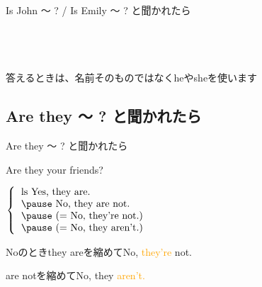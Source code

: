 \documentclass[aspectratio=169]{beamer}
\newcommand{\myaudio}[1]{\href{#1}{\faVolumeUp}}
\begin{document}
\begin{frame}[plain]{Is John  〜 ? / Is Emily 〜 ? と聞かれたら}
\begin{columns}[t]
\begin{column}{.49\textwidth}
\pause

\vspace{20pt}

\mbox{}\hfill\myaudio{./audio/009_answer_be_03.mp3}\,\,{}
\end{column}
\end{columns}

\pause

{\small 答えるときは、名前そのものではなくheやsheを使います}
\end{frame}

 \subsection{Are they 〜 ? と聞かれたら}
\begin{frame}[plain]{Are they 〜 ? と聞かれたら}
 \Large


\pause

Are they your friends?

\pause

\vspace{10pt}

\mbox{}\hspace{100pt}$\left\{\begin{tabular}{l}ls
         Yes, they are.\\\pause
         No, they are not.\\\pause
         \text{(}= \text{No, they're not.)}\\\pause
         \text{(}= \text{No, they aren't.)}
        \end{tabular}\right.$
\vspace{10pt}

\mbox{}\hfill{}{\small Noのときthey areを縮めてNo, \textcolor{orange}{they're} not.}

\vspace{-8pt}

\mbox{}\hfill{}{\small \phantom{Noのとき}are notを縮めてNo, they \textcolor{orange}{aren't.}}

\vspace{20pt}

\mbox{}\hfill\myaudio{./audio/009_answer_be_04.mp3}\,\,{}
\end{frame}
\end{document}
